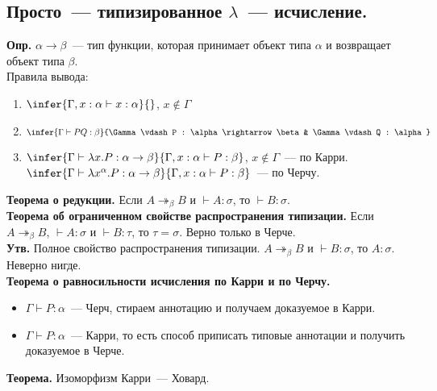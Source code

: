 \documentclass{article}
\begin{document}
	\subsection{Просто~--- типизированное $\lambda$~--- исчисление.}
	\textbf{Опр.} $\alpha \rightarrow \beta$~--- тип функции, которая принимает объект типа $\alpha$ и возвращает объект типа $\beta$. \\
	Правила вывода:
	\begin{enumerate}
		\item $\infer{\Gamma, x : \alpha \vdash x : \alpha}{}$, $x \not\in \Gamma$
		\item $\infer{\Gamma \vdash P Q : \beta}{\Gamma \vdash P : \alpha \rightarrow \beta & \Gamma \vdash Q : \alpha}$
		\item $\infer{\Gamma \vdash \lambda x. P : \alpha \rightarrow \beta}{\Gamma, x : \alpha \vdash P : \beta}$, $x \not\in \Gamma$~--- по Карри. \\
		$\infer{\Gamma \vdash \lambda x^{\alpha}. P : \alpha \rightarrow \beta}{\Gamma, x : \alpha \vdash P : \beta}$~--- по Черчу.
	\end{enumerate}
	\textbf{Теорема о редукции.} Если $A \twoheadrightarrow_{\beta} B$ и $\vdash A : \sigma$, то $\vdash B : \sigma$. \\
	\textbf{Теорема об ограниченном свойстве распространения типизации.} Если $A \twoheadrightarrow_{\beta} B$, $\vdash A : \sigma$ и $\vdash B : \tau$, то $\tau = \sigma$. Верно только в Черче. \\
	\textbf{Утв.} Полное свойство распространения типизации. $A \twoheadrightarrow_{\beta} B$ и $\vdash B : \sigma$, то $A : \sigma$. Неверно нигде. \\
	\textbf{Теорема о равносильности исчисления по Карри и по Черчу.}
	\begin{itemize}
		\item $\Gamma \vdash P : \alpha$~--- Черч, стираем аннотацию и получаем доказуемое в Карри.
		\item $\Gamma \vdash P : \alpha$~--- Карри, то есть способ приписать типовые аннотации и получить доказуемое в Черче.
	\end{itemize}
	\textbf{Теорема.} Изоморфизм Карри~--- Ховард.
\end{document}
